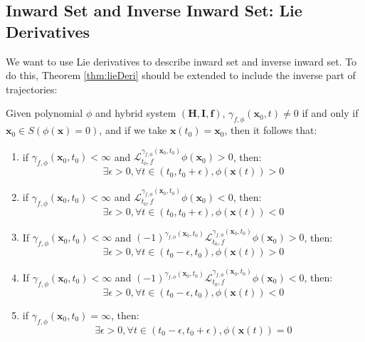 \documentclass{article}
\begin{document}
\subsection{Inward Set and Inverse Inward Set: Lie Derivatives}
We want to use Lie derivatives to describe inward set and inverse inward set. To do this, Theorem \ref{thm:lieDeri} should be extended to include the inverse part of trajectories:
\begin{Theorem}
\label{thm:pLieDeri}
Given polynomial $\phi$ and hybrid system $(\boldsymbol{H}, \boldsymbol{I}, \boldsymbol{f})$, $\gamma_{f, \phi}(\boldsymbol{x}_0, t) \neq 0$ if and only if $\boldsymbol{x}_0 \in S(\phi(\boldsymbol{x}) = 0)$,  and if we take $\boldsymbol{x}(t_0) = \boldsymbol{x}_0$, then it follows that: 
\begin{enumerate}
	\item if $\gamma_{f, \phi}(\boldsymbol{x}_0, t_0) < \infty$ and $\mathcal{L}_{t_0, f}^{\gamma_{f, \phi}(\boldsymbol{x}_0, t_0)} \phi (\boldsymbol{x}_0) > 0$, then: 
		\begin{equation*}
			\exists \epsilon > 0, \forall t \in (t_0, t_0 + \epsilon),\phi (\boldsymbol{x}(t)) > 0
		\end{equation*}
	\item if $\gamma_{f, \phi}(\boldsymbol{x}_0, t_0) < \infty$ and $\mathcal{L}_{t_0, f}^{\gamma_{f, \phi}(\boldsymbol{x}_0, t_0)} \phi (\boldsymbol{x}_0) < 0$, then: 
		\begin{equation*}
			\exists \epsilon > 0, \forall t \in (t_0, t_0 + \epsilon),\phi (\boldsymbol{x}(t)) < 0
		\end{equation*}
	\item If $\gamma_{f, \phi}(\boldsymbol{x}_0, t_0) < \infty$ and $(-1)^{\gamma_{f, \phi}(\boldsymbol{x}_0, t_0)} \mathcal{L}_{t_0, f}^{\gamma_{f, \phi}(\boldsymbol{x}_0, t_0)} \phi (\boldsymbol{x}_0) > 0$, then: 
		\begin{equation*}
			\exists \epsilon > 0, \forall t \in (t_0 - \epsilon, t_0),\phi (\boldsymbol{x}(t)) > 0
		\end{equation*}
	\item If $\gamma_{f, \phi}(\boldsymbol{x}_0, t_0) < \infty$ and $(-1)^{\gamma_{f, \phi}(\boldsymbol{x}_0, t_0)} \mathcal{L}_{t_0, f}^{\gamma_{f, \phi}(\boldsymbol{x}_0, t_0)} \phi (\boldsymbol{x}_0) < 0$, then: 
		\begin{equation*}
			\exists \epsilon > 0, \forall t \in (t_0 - \epsilon, t_0),\phi (\boldsymbol{x}(t)) < 0
		\end{equation*}
	\item if $\gamma_{f, \phi}(\boldsymbol{x}_0, t_0) = \infty$, then: 
		\begin{equation*}
			\exists \epsilon > 0, \forall t \in (t_0 - \epsilon, t_0 + \epsilon),\phi (\boldsymbol{x}(t)) = 0
		\end{equation*}
\end{enumerate}
\end{Theorem}
\end{document}
